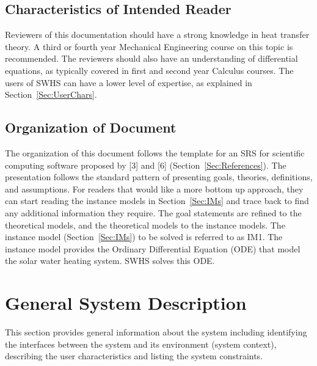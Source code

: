\documentclass[12pt]{article}
\begin{document}
\subsection{Characteristics of Intended Reader}
\label{Sec:ReaderChars}
Reviewers of this documentation should have a strong knowledge in heat transfer theory. A third or fourth year Mechanical Engineering course on this topic is recommended. The reviewers should also have an understanding of differential equations, as typically covered in first and second year Calculus courses. The users of SWHS can have a lower level of expertise, as explained in Section~\ref{Sec:UserChars}.
\subsection{Organization of Document}
\label{Sec:DocOrg}
The organization of this document follows the template for an SRS for scientific computing software proposed by {[}3{]} and {[}6{]} (Section~\ref{Sec:References}). The presentation follows the standard pattern of presenting goals, theories, definitions, and assumptions. For readers that would like a more bottom up approach, they can start reading the instance models in Section~\ref{Sec:IMs} and trace back to find any additional information they require.
The goal statements are refined to the theoretical models, and the theoretical models to the instance models. The instance model (Section~\ref{Sec:IMs}) to be solved is referred to as IM1. The instance model provides the Ordinary Differential Equation (ODE) that model the solar water heating system. SWHS solves this ODE.
\section{General System Description}
\label{Sec:GenSysDesc}
This section provides general information about the system including identifying the interfaces between the system and its environment (system context), describing the user characteristics and listing the system constraints.
\end{document}
